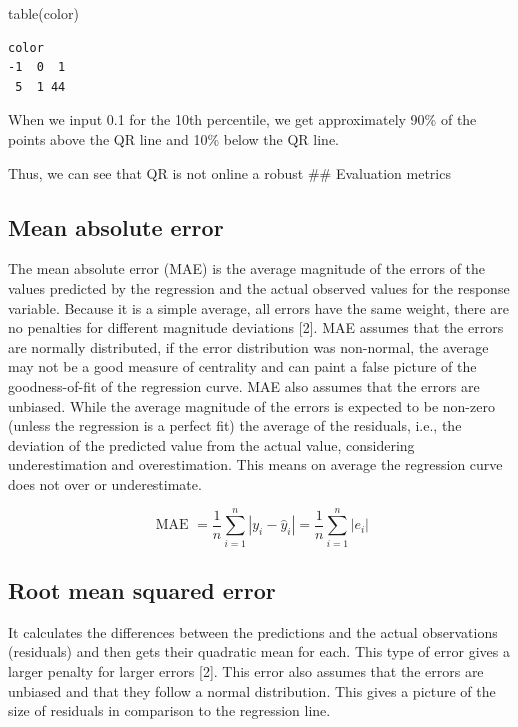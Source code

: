 \documentclass[
  letterpaper,
  DIV=11,
  numbers=noendperiod]{scrreprt}
\newenvironment{Shaded}{\begin{snugshade}}{\end{snugshade}}
\newcommand{\FunctionTok}[1]{\textcolor[rgb]{0.28,0.35,0.67}{#1}}
\newcommand{\NormalTok}[1]{\textcolor[rgb]{0.00,0.23,0.31}{#1}}
\begin{document}
\begin{Shaded}
\begin{Highlighting}[]
\FunctionTok{table}\NormalTok{(color)}
\end{Highlighting}
\end{Shaded}

\begin{verbatim}
color
-1  0  1 
 5  1 44 
\end{verbatim}

When we input 0.1 for the 10th percentile, we get approximately 90\% of
the points above the QR line and 10\% below the QR line.

Thus, we can see that QR is not online a robust \#\# Evaluation metrics

\hypertarget{mean-absolute-error}{%
\subsection{Mean absolute error}\label{mean-absolute-error}}

The mean absolute error (MAE) is the average magnitude of the errors of
the values predicted by the regression and the actual observed values
for the response variable. Because it is a simple average, all errors
have the same weight, there are no penalties for different magnitude
deviations {[}2{]}. MAE assumes that the errors are normally
distributed, if the error distribution was non-normal, the average may
not be a good measure of centrality and can paint a false picture of the
goodness-of-fit of the regression curve. MAE also assumes that the
errors are unbiased. While the average magnitude of the errors is
expected to be non-zero (unless the regression is a perfect fit) the
average of the residuals, i.e., the deviation of the predicted value
from the actual value, considering underestimation and overestimation.
This means on average the regression curve does not over or
underestimate.

\[
\text { MAE }=\frac{1}{n}\sum_{i=1}^n\left|y_i-\hat{y}_i\right|=\frac{1}{n}\sum_{i=1}^n\left|e_i\right|
\]

\hypertarget{root-mean-squared-error}{%
\subsection{Root mean squared error}\label{root-mean-squared-error}}

It calculates the differences between the predictions and the actual
observations (residuals) and then gets their quadratic mean for each.
This type of error gives a larger penalty for larger errors {[}2{]}.
This error also assumes that the errors are unbiased and that they
follow a normal distribution. This gives a picture of the size of
residuals in comparison to the regression line.
\end{document}

